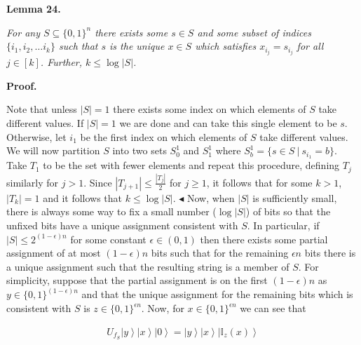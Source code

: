 \documentclass[10pt,a4paper]{article}
\begin{document}


\par\medskip\noindent\textbf{
\textbf{Lemma 24}\textbf{.}
}\par



\emph{For any $S\subseteq\{0,1\}^{n}$ there exists some $s\in S$ and some subset of indices $\{i_{1},i_{2},\dots i_{k}\}$ such that $s$ is the unique $x\in S$ which satisfies
$x_{i_{j}}=s_{i_{j}}$ for all $j\in[k]$. Further, $k\leq\log{|S|}$.}\par







\par\medskip\noindent\textbf{Proof.}\par




Note that unless $|S|=1$ there exists some index on which elements of $S$ take different values. If $|S|=1$ we are done and can take this single element to be $s$. Otherwise, let $i_{1}$ be the first index on which elements of $S$ take different values. We will now partition $S$ into two sets $S^{1}_{0}$ and $S^{1}_{1}$ where $S^{1}_{b}=\{s\in S\ |\ s_{i_{1}}=b\}$. Take $T_{1}$ to be the set with fewer elements and repeat this procedure, defining $T_{j}$ similarly for $j>1$. Since $|T_{j+1}|\leq\frac{|T_{j}|}{2}$ for $j\geq 1$, it follows that for some $k>1$, $|T_{k}|=1$ and it follows that $k\leq\log{|S|}$.
$\blacktriangleleft$
Now, when $|S|$ is sufficiently small, there is always some way to fix a small number ($\log|S|$) of bits so that the unfixed bits have a unique assignment consistent with $S$. In particular, if $|S|\leq 2^{(1-\epsilon)n}$ for some constant $\epsilon\in(0,1)$ then there exists some partial assignment of at most $(1-\epsilon)n$ bits such that for the remaining $\epsilon n$ bits there is a unique assignment such that the resulting string is a member of $S$. For simplicity, suppose that the partial assignment is on the first $(1-\epsilon)n$ as $y\in\{0,1\}^{(1-\epsilon)n}$ and that the unique assignment for the remaining bits which is consistent with $S$ is $z\in\{0,1\}^{\epsilon n}$. Now, for $x\in\{0,1\}^{\epsilon n}$ we can see that\par


\[\begin{gathered}
\displaystyle U_{f_{S}}\left|y\right\rangle\left|x\right\rangle\left|0\right\rangle=\left|y\right\rangle\left|x\right\rangle\left|\mathbb{I}_{z}(x)\right\rangle
\end{gathered}\]
\end{document}
